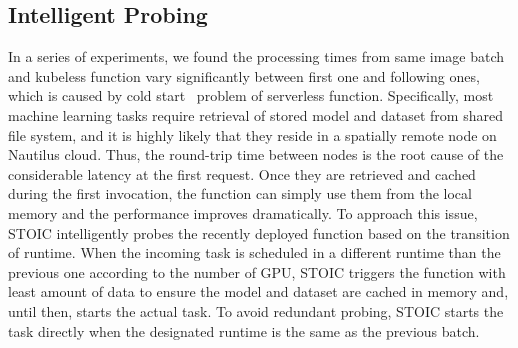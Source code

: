  \subsection{Intelligent Probing}
 In a series of experiments, we found the processing times from same image batch and kubeless function vary significantly between first one and following ones, which is caused by cold start~\cite{ref:coldstart} problem of serverless function. Specifically, most machine learning tasks require retrieval of stored model and dataset from shared file system, and it is highly likely that they reside in a spatially remote node on Nautilus cloud. Thus, the round-trip time between nodes is the root cause of the considerable latency at the first request. Once they are retrieved and cached during the first invocation, the function can simply use them from the local memory and the performance improves dramatically. To approach this issue, STOIC intelligently probes the recently deployed function based on the transition of runtime. When the incoming task is scheduled in a different runtime than the previous one according to the number of GPU, STOIC triggers the function with least amount of data to ensure the model and dataset are cached in memory and, until then, starts the actual task. To avoid redundant probing, STOIC starts the task directly when the designated runtime is the same as the previous batch.